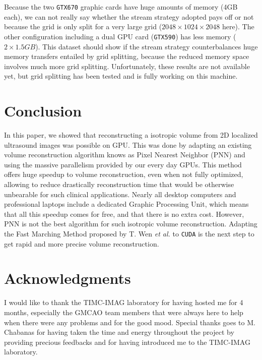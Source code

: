 \documentclass[12pt,journal,compsoc]{IEEEtran}
\begin{document}
Because the two \texttt{GTX670} graphic cards have huge amounts of memory (4GB each), we can not really say whether the stream strategy adopted pays off or not because the grid is only split for a very large grid ($2048\times1024\times2048$ here). 
The other configuration including a dual GPU card (\texttt{GTX590}) has less memory ($2\times1.5GB$). This dataset should show if the stream strategy counterbalances huge memory transfers entailed by grid splitting, because the reduced memory space involves much more grid splitting. Unfortunately, these results are not available yet, but grid splitting has been tested and is fully working on this machine.

\newpage
\section{Conclusion}
In this paper, we showed that reconstructing a isotropic volume from 2D localized ultrasound images was possible on GPU.
This was done by adapting an existing volume reconstruction algorithm knows as Pixel Nearest Neighbor (PNN) and using the massive parallelism provided by our every day GPUs.
This method offers huge speedup to volume reconstruction, even when not fully optimized, allowing to reduce drastically reconstruction time that would be otherwise unbearable for such clinical applications.
Nearly all desktop computers and professional laptops include a dedicated Graphic Processing Unit, which means that all this speedup comes for free, and that there is no extra cost.
However, PNN is not the best algorithm for such isotropic volume reconstruction. Adapting the Fast Marching Method proposed by T. Wen \textit{et al.} \textbf{\cite{2}} to \texttt{CUDA} is the next step to get rapid and more precise volume reconstruction.


\section*{Acknowledgments}
I would like to thank the TIMC-IMAG laboratory for having hosted me for 4 months, especially the GMCAO team members that were always here to help when there were any problems and for the good mood. Special thanks goes to M. Chabanas for having taken the time and energy throughout the project by providing precious feedbacks and for having introduced me to the TIMC-IMAG laboratory.




\appendices
\end{document}
